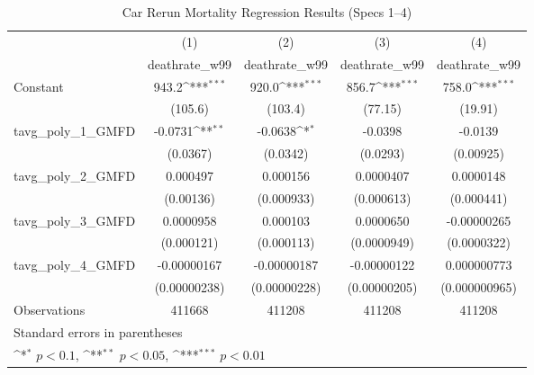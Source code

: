 \begin{table}[htbp]\centering
\def\sym#1{\ifmmode^{#1}\else\(^{#1}\)\fi}
\caption{Car Rerun Mortality Regression Results (Specs 1–4)}
\begin{tabular}{l*{4}{c}}
\hline\hline
                    &\multicolumn{1}{c}{(1)}&\multicolumn{1}{c}{(2)}&\multicolumn{1}{c}{(3)}&\multicolumn{1}{c}{(4)}\\
                    &\multicolumn{1}{c}{deathrate\_w99}&\multicolumn{1}{c}{deathrate\_w99}&\multicolumn{1}{c}{deathrate\_w99}&\multicolumn{1}{c}{deathrate\_w99}\\
\hline
Constant            &       943.2\sym{***}&       920.0\sym{***}&       856.7\sym{***}&       758.0\sym{***}\\
                    &     (105.6)         &     (103.4)         &     (77.15)         &     (19.91)         \\
[1em]
tavg\_poly\_1\_GMFD    &     -0.0731\sym{**} &     -0.0638\sym{*}  &     -0.0398         &     -0.0139         \\
                    &    (0.0367)         &    (0.0342)         &    (0.0293)         &   (0.00925)         \\
[1em]
tavg\_poly\_2\_GMFD    &    0.000497         &    0.000156         &   0.0000407         &   0.0000148         \\
                    &   (0.00136)         &  (0.000933)         &  (0.000613)         &  (0.000441)         \\
[1em]
tavg\_poly\_3\_GMFD    &   0.0000958         &    0.000103         &   0.0000650         & -0.00000265         \\
                    &  (0.000121)         &  (0.000113)         & (0.0000949)         & (0.0000322)         \\
[1em]
tavg\_poly\_4\_GMFD    & -0.00000167         & -0.00000187         & -0.00000122         & 0.000000773         \\
                    &(0.00000238)         &(0.00000228)         &(0.00000205)         &(0.000000965)         \\
\hline
Observations        &      411668         &      411208         &      411208         &      411208         \\
\hline\hline
\multicolumn{5}{l}{\footnotesize Standard errors in parentheses}\\
\multicolumn{5}{l}{\footnotesize \sym{*} \(p<0.1\), \sym{**} \(p<0.05\), \sym{***} \(p<0.01\)}\\
\end{tabular}
\end{table}
